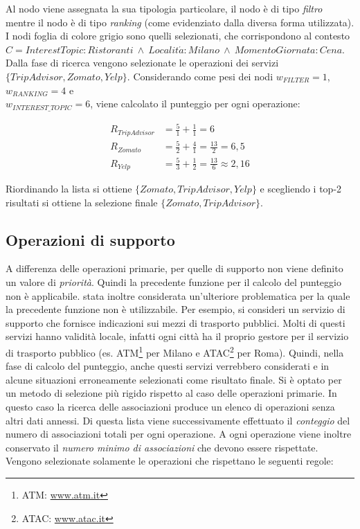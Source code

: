 Al nodo  viene assegnata la sua tipologia particolare, il nodo  è di tipo \emph{filtro} mentre il nodo  è di tipo \emph{ranking} (come evidenziato dalla diversa forma utilizzata). I nodi foglia di colore grigio sono quelli selezionati, che corrispondono al contesto $ C = InterestTopic: Ristoranti\ \land\ Localit\acute{a}: Milano\ \land\ MomentoGiornata: Cena $. Dalla fase di ricerca vengono selezionate le operazioni dei servizi $ \{TripAdvisor, Zomato, Yelp\} $. Considerando come pesi dei nodi $ w_{FILTER} = 1 $, $ w_{RANKING} = 4 $ e\\ $ w_{INTEREST\_TOPIC} = 6 $, viene calcolato il punteggio per ogni operazione:

\begin{align*}
R_{TripAdvisor} &= \frac{5}{1} + \frac{1}{1} = 6 \\
R_{Zomato} &= \frac{5}{2} + \frac{4}{1} = \frac{13}{2} = 6,5\\
R_{Yelp} &= \frac{5}{3} + \frac{1}{2} = \frac{13}{6} \approx 2,16
\end{align*} 

Riordinando la lista si ottiene $ \{ Zomato, TripAdvisor, Yelp \} $ e scegliendo i top-2 risultati si ottiene la selezione finale $ \{ Zomato, TripAdvisor \} $.

\subsection*{Operazioni di supporto}

A differenza delle operazioni primarie, per quelle di supporto non viene definito un valore di \emph{priorità}. Quindi la precedente funzione per il calcolo del punteggio non è applicabile. \upe stata inoltre considerata un'ulteriore problematica per la quale la precedente funzione non è utilizzabile. Per esempio, si consideri un servizio di supporto che fornisce indicazioni sui mezzi di trasporto pubblici. Molti di questi servizi hanno validità locale, infatti ogni città ha il proprio gestore per il servizio di trasporto pubblico (es. ATM\footnote{ATM: \url{www.atm.it}} per Milano e ATAC\footnote{ATAC: \url{www.atac.it}} per Roma). Quindi, nella fase di calcolo del punteggio, anche questi servizi verrebbero considerati e in alcune situazioni erroneamente selezionati come risultato finale. Si è optato per un metodo di selezione più rigido rispetto al caso delle operazioni primarie. In questo caso la ricerca delle associazioni produce un elenco di operazioni senza altri dati annessi. Di questa lista viene successivamente effettuato il \emph{conteggio} del numero di associazioni totali per ogni operazione. A ogni operazione viene inoltre conservato il \emph{numero minimo di associazioni} che devono essere rispettate. Vengono selezionate solamente le operazioni che rispettano le seguenti regole:


